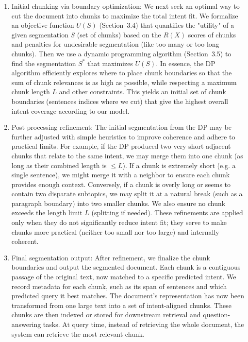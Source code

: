 \documentclass[12pt,a4paper]{report}
\begin{document}
\begin{enumerate}
\[    \] 
    where $Q=\{q_1,\dots,q_M\}$ is the set of predicted intent vectors. $R(X)$ is a single number indicating how well chunk $X$ could act as an answer to at least one predicted question. A higher $R(X)$ means the chunk is very relevant to some anticipated query.
    \item Initial chunking via boundary optimization: We next seek an optimal way to cut the document into chunks to maximize the total intent fit. We formalize an objective function $U(S)$ (Section~3.4) that quantifies the "utility" of a given segmentation $S$ (set of chunks) based on the $R(X)$ scores of chunks and penalties for undesirable segmentation (like too many or too long chunks). Then we use a dynamic programming algorithm (Section~3.5) to find the segmentation $S^*$ that maximizes $U(S)$. In essence, the DP algorithm efficiently explores where to place chunk boundaries so that the sum of chunk relevances is as high as possible, while respecting a maximum chunk length $L$ and other constraints. This yields an initial set of chunk boundaries (sentences indices where we cut) that give the highest overall intent coverage according to our model.
    \item Post-processing refinement: The initial segmentation from the DP may be further adjusted with simple heuristics to improve coherence and adhere to practical limits. For example, if the DP produced two very short adjacent chunks that relate to the same intent, we may merge them into one chunk (as long as their combined length is $\le L$). If a chunk is extremely short (e.g. a single sentence), we might merge it with a neighbor to ensure each chunk provides enough context. Conversely, if a chunk is overly long or seems to contain two disparate subtopics, we may split it at a natural break (such as a paragraph boundary) into two smaller chunks. We also ensure no chunk exceeds the length limit $L$ (splitting if needed). These refinements are applied only when they do not significantly reduce intent fit; they serve to make chunks more practical (neither too small nor too large) and internally coherent.
    \item Final segmentation output: After refinement, we finalize the chunk boundaries and output the segmented document. Each chunk is a contiguous passage of the original text, now matched to a specific predicted intent. We record metadata for each chunk, such as its span of sentences and which predicted query it best matches. The document's representation has now been transformed from one large text into a set of intent-aligned chunks. These chunks are then indexed or stored for downstream retrieval and question-answering tasks. At query time, instead of retrieving the whole document, the system can retrieve the most relevant chunk.

\end{enumerate}
\end{document}
